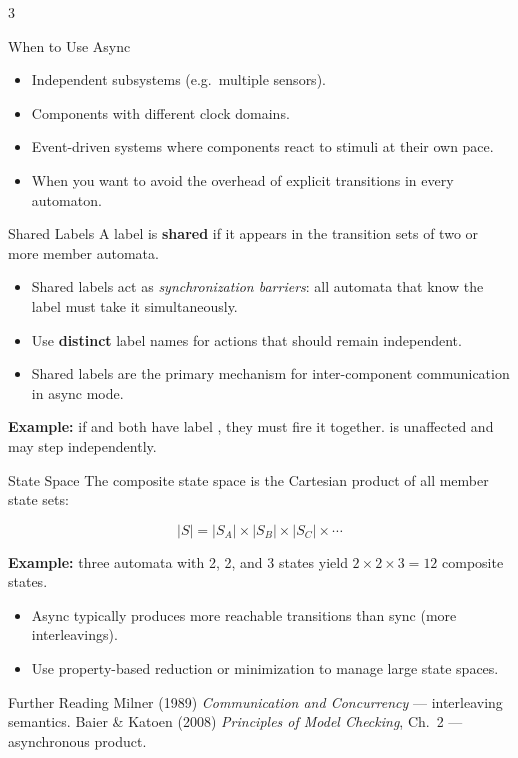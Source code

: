 \begin{multicols}{3}
\begin{tipbox}{When to Use Async}
\begin{itemize}
  \item Independent subsystems (e.g.\ multiple sensors).
  \item Components with different clock domains.
  \item Event-driven systems where components react to
        stimuli at their own pace.
  \item When you want to avoid the overhead of explicit
         transitions in every automaton.
\end{itemize}
\end{tipbox}

\columnbreak


\begin{cheatbox}{Shared Labels}
A label is \textbf{shared} if it appears in the transition
sets of two or more member automata.

\begin{itemize}
  \item Shared labels act as \emph{synchronization barriers}:
        all automata that know the label must take it
        simultaneously.
  \item Use \textbf{distinct} label names for actions that
        should remain independent.
  \item Shared labels are the primary mechanism for
        inter-component communication in async mode.
\end{itemize}

\medskip
\textbf{Example:} if  and  both have label
, they must fire it together.   is
unaffected and may step independently.
\end{cheatbox}

\begin{cheatbox}{State Space}
The composite state space is the Cartesian product of all
member state sets:

\[
  |S| = |S_A| \times |S_B| \times |S_C| \times \cdots
\]

\textbf{Example:} three automata with 2, 2, and 3 states
yield $2 \times 2 \times 3 = 12$ composite states.

\medskip
\begin{itemize}
  \item Async typically produces more reachable transitions
        than sync (more interleavings).
  \item Use property-based reduction or minimization to
        manage large state spaces.
\end{itemize}
\end{cheatbox}

\begin{tipbox}{Further Reading}
Milner (1989) \textit{Communication and Concurrency} --- interleaving semantics.
Baier \& Katoen (2008) \textit{Principles of Model Checking}, Ch.~2 --- asynchronous product.
\end{tipbox}

\end{multicols}

